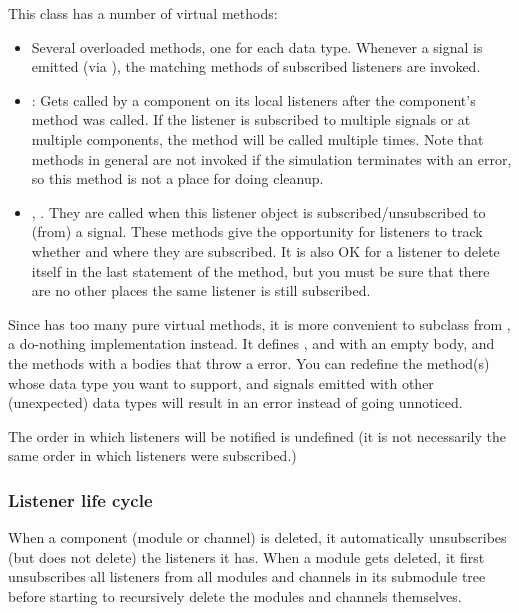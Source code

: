 This class has a number of virtual methods:

\begin{itemize}
  \item Several overloaded  methods, one for each
    data type. Whenever a signal is emitted (via ),
    the matching  methods of subscribed listeners
    are invoked.
  \item {}: Gets called by a component on its local listeners
    after the component's  method was called. If the listener
    is subscribed to multiple signals or at multiple components, the method
    will be called multiple times. Note that  methods in general
    are not invoked if the simulation terminates with an error, so this method
    is not a place for doing cleanup.
  \item {}, . They are called
    when this listener object is subscribed/unsubscribed to (from) a signal.
    These methods give the opportunity for listeners to track whether
    and where they are subscribed. It is also OK for a listener to delete
    itself in the last statement of the  method,
    but you must be sure that there are no other places the same listener
    is still subscribed.
\end{itemize}

Since  has too many pure virtual methods, it is more
convenient to subclass from , a do-nothing implementation
instead. It defines ,  and
 with an empty body, and the 
methods with a bodies that throw a  error.
You can redefine the  method(s) whose data type
you want to support, and signals emitted with other (unexpected) data
types will result in an error instead of going unnoticed.

The order in which listeners will be notified is undefined (it is not necessarily
the same order in which listeners were subscribed.)

\subsubsection{Listener life cycle}
\label{sec:simple-modules:signals:life-cycle}

When a component (module or channel) is deleted, it automatically
unsubscribes (but does not delete) the listeners it has. When a
module gets deleted, it first unsubscribes all listeners from all
modules and channels in its submodule tree before starting
to recursively delete the modules and channels themselves.

